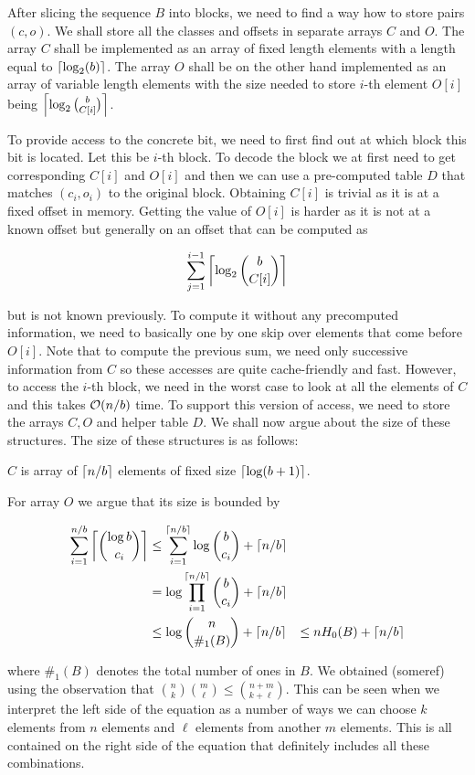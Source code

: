 After slicing the sequence $B$ into blocks, we need to find a way how to store pairs $(c, o)$.
We shall store all the classes and offsets in separate arrays $C$ and $O$. The array $C$ shall
be implemented as an array of fixed length elements with a length equal to
$\left\lceil \log_2(b) \right\rceil$. The array $O$ shall be on the other hand implemented as an array of
variable length elements with the size needed to store $i$-th element $O[i]$ being
$\left\lceil \log_2{b\choose C[i]} \right\rceil$.

To provide access to the concrete bit, we need to first find out at which block this bit is located.
Let this be $i$-th block. To decode the block we at first need to get corresponding $C[i]$ and
$O[i]$ and then we can use a pre-computed table $D$ that matches $(c_i, o_i)$ to the original
block. Obtaining $C[i]$ is trivial as it is at a fixed offset in memory. Getting the value of
$O[i]$ is harder as it is not at a known offset but generally on an offset that can be computed
as

                $$\sum_{j=1}^{i-1} \left\lceil \log_2{b\choose C[i]} \right\rceil$$

but is not known previously. To compute it without any precomputed information,
we need to basically one by one skip over elements that come before $O[i]$.
Note that to compute the previous sum, we need only successive information from $C$ so these
accesses are quite cache-friendly and fast. However, to access the $i$-th block, we need in the
worst case to look at all the elements of $C$ and this takes $\mathcal{O}(n/b)$ time. To support
this version of access, we need to store the arrays $C, O$ and helper table $D$. We shall
now argue about the size of these structures. The size of these structures is
as follows:

$C$ is array of $\left\lceil n/b \right\rceil$ elements of fixed size $\left\lceil \log(b+1) \right\rceil$.

For array $O$ we argue that its size is bounded by

\begin{align*}
    \sum_{i=1}^{n/b} \left\lceil {\log b\choose c_i} \right\rceil
    &\leq \sum_{i=1}^{\left\lceil n/b \right\rceil} \log {b\choose c_i} + \left\lceil n/b \right\rceil \\
    &= \log\prod_{i=1}^{\left\lceil n/b \right\rceil} {b\choose c_i} + \left\lceil n/b \right\rceil \\
    &\leq \log{n\choose \#_1(B)} + \left\lceil n/b \right\rceil &\leq nH_0(B) + \left\lceil n/b \right\rceil
\end{align*}

where $\#_1(B)$ denotes the total number of ones in $B$. We obtained (someref) using the
observation that ${n\choose k} {m\choose \ell} \leq {n+m\choose k+\ell}$. This can be seen
when we interpret the left side of the equation as a number of ways we can choose $k$ elements
from $n$ elements and $\ell$ elements from another $m$ elements. This is all contained on the
right side of the equation that definitely includes all these combinations.


